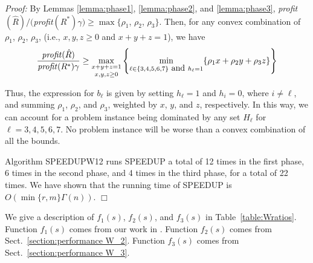 \documentclass[11pt]{article}
\newcommand\QED{\ifhmode\allowbreak\else\nobreak\fi
\quad\nobreak$\Box$\medbreak}
\newcommand{\proofstart}{\par\noindent \emph{Proof:} }
\newcommand{\proofend}{\QED\par}
\newenvironment{proof}{\proofstart}{\proofend}
\begin{document}
\begin{proof}
By Lemmas \ref{lemma:phase1}, \ref{lemma:phase2}, and \ref{lemma:phase3}, {\it profit}$(\hat{R})/(${\it profit}$(R^*)\gamma ) \geq \max\{\rho_1$, $\rho_2$, $\rho_3\}$.
Then, for any convex combination of $\rho_1$, $\rho_2$, $\rho_3$, (i.e., $x,y,z \geq 0$ and $x + y + z = 1$), we have 
$${\mbox{\emph{profit}}(\hat{R}) \over \mbox{\emph{profit}}(R^*)\gamma }
\geq \mathop{\max_{x + y + z = 1}}_{x, y, z \geq 0}\left\{\min_{\ell \in \{3,4,5,6,7\}\mbox{ and }h_\ell=1}\{ \rho_1 x+ \rho_2 y + \rho_3 z\}\right\}$$

Thus, the expression for $b_\ell$ is given by setting $h_\ell = 1$ and $h_i = 0$, where $i \neq \ell$, and summing $\rho_1$, $\rho_2$, and $\rho_3$, weighted by $x$, $y$, and $z$, respectively.  In this way, we can account for a problem instance being dominated by any set $H_\ell$ for $\ell = 3,4,5,6,7$.  No problem instance will be worse than a convex combination of all the bounds.  

Algorithm SPEEDUPW12 runs SPEEDUP a total of 12 times in the first phase, 6 times in the second phase, and 4 times in the third phase, for a total of 22 times.  We have shown that the running time of SPEEDUP is $O(\min \{r,m\}\Gamma(n))$.
\end{proof}

We give a description of $f_1(s)$, $f_2(s)$, and $f_3(s)$ in Table~\ref{table:Wratios}.
Function $f_1(s)$ comes from our work in \cite{Frederickson5}.  Function $f_2(s)$ comes from Sect.~\ref{section:performance W_2}.  Function $f_3(s)$ comes from Sect.~\ref{section:performance W_3}.
\end{document}
